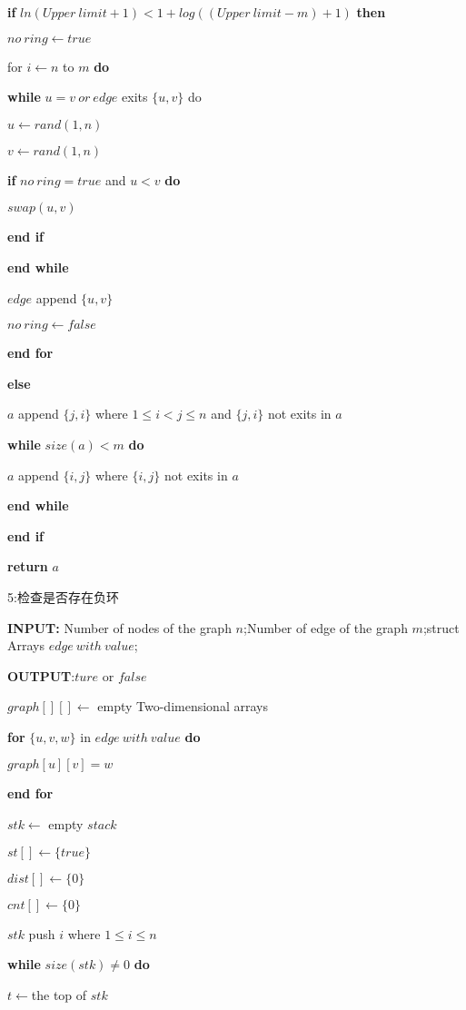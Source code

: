 \documentclass[
]{article}
\begin{document}
\textbf{if} \(ln(Upper\ limit+1)<1+log((Upper\ limit-m)+1)\)
\textbf{then}

\(no\ ring\gets true\)

for \(i\gets n\) to \(m\) \textbf{do}

\textbf{while} \(u=v\ or\ edge\) exits \(\{u,v\}\) do

\(u\gets rand(1,n)\)

\(v\gets rand(1,n)\)

\textbf{if} \(no\ ring = true\) and \(u<v\) \textbf{do}

\(swap(u,v)\)

\textbf{end if}

\textbf{end while}

\(edge\) append \(\{u,v\}\)

\(no\ ring\gets false\)

\textbf{end for}

\textbf{else}

\(a\) append \(\{j,i\}\) where \(1\leq i < j \leq n\) and \(\{j,i\}\)
not exits in \(a\)

\textbf{while} \(size(a)< m\) \textbf{do}

\(a\) append \(\{i,j\}\) where \(\{i,j\}\) not exits in \(a\)

\textbf{end while}

\textbf{end if}

\textbf{return} \(a\)

5:检查是否存在负环

\textbf{INPUT:} Number of nodes of the graph \(n\);Number of edge of the
graph \(m\);struct Arrays \(edge\ with\ value\);

\textbf{OUTPUT}:\(ture\) or \(false\)

\(graph[][]\gets\) empty Two-dimensional arrays

\textbf{for} \(\{u,v,w\}\) in \(edge\ with\ value\) \textbf{do}

\(graph[u][v]=w\)

\textbf{end for}

\(stk\gets\) empty \(stack\)

\(st[] \gets \{true\}\)

\(dist[] \gets \{0\}\)

\(cnt[] \gets \{0\}\)

\(stk\) push \(i\) where \(1\leq i \leq n\)

\textbf{while} \(size(stk)\neq0\) \textbf{do}

\(t\gets \)the top of \(stk\)
\end{document}
